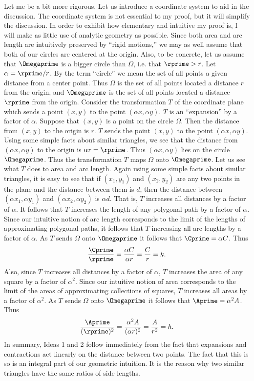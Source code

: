 \documentclass[twoside,twocolumn,12pt]{amsart}
\theoremstyle{plain}
\theoremstyle{definition}
\begin{document}
Let me be a bit more rigorous. Let us introduce a coordinate system
to aid in the discussion. The coordinate system is not essential to
my proof, but it will simplify the discussion.
In order to exhibit how elementary
and intuitive my proof is,  I will make as little use of
analytic geometry as possible.
Since both area and arc length are
intuitively preserved
by ``rigid motions,'' we may as well assume that both of our circles
are centered at the origin. Also, to be concrete, let us assume that
$\Omegaprime$ is a bigger circle than $\Omega$, i.e. that $\rprime>r$.
Let $\alpha=\rprime/r$.
By the term ``circle''
we mean the set of all points a given distance from a center point.
Thus $\Omega$ is the set of all points located a distance $r$ from the
origin, and $\Omegaprime$ is the set of all points located a distance
$\rprime$ from the origin.
Consider the transformation $T$ of the coordinate
plane which sends a point $(x,y)$ to the point $(\alpha x, \alpha y)$.
$T$ is an ``expansion'' by a factor of $\alpha$. Suppose that $(x,y)$ is
a point on the circle $\Omega$. Then the distance from $(x,y)$ to
the origin is $r$. $T$ sends the point $(x,y)$ to the point
$(\alpha x, \alpha y)$. Using some simple facts about similar triangles,
  we see that the distance from $(\alpha x, \alpha y)$ to the
origin is $\alpha r =\rprime$. Thus $(\alpha x, \alpha y)$ lies on
the circle $\Omegaprime$. Thus the transformation $T$ maps
$\Omega$ onto $\Omegaprime$. Let us see what $T$ does to area and
arc length.  Again using some simple facts about similar triangles,
it is easy to see that if $(x_1,y_1)$ and $(x_2,y_2)$ are any two
points in the plane and the distance between them is $d$, then the distance
between $(\alpha x_1, \alpha y_1)$ and $(\alpha x_2, \alpha y_2)$
is $\alpha d$. That is, $T$ increases all distances by a factor of $\alpha$.
It follows that $T$ increases the length of any polygonal path by a
factor of $\alpha$. Since our intuitive notion of  arc length corresponds
to the limit of the lengths of approximating polygonal paths, it follows
that $T$ increasing all arc lengths by a factor of $\alpha$. As $T$ sends
$\Omega$ onto $\Omegaprime$ it follows that $\Cprime=\alpha C$.
Thus
$$\frac{\Cprime}{\rprime}=\frac{\alpha C}{\alpha r}=\frac{C}{r}=k.$$
Also, since $T$ increases all distances by a factor of $\alpha$, $T$
increases the area of any square by a factor of $\alpha^2$. Since our
intuitive notion of area corresponds to the limit of the areas of
approximating collections of squares, $T$ increases all areas by a factor
of $\alpha^2$. As $T$ sends $\Omega$ onto $\Omegaprime$ it follows that
$\Aprime=\alpha^2 A$. Thus
$$\frac{\Aprime}{(\rprime)^2}=
\frac{\alpha^2 A}{(\alpha r)^2}=\frac{A}{r^2}=h.$$
In summary, Ideas 1 and 2 follow immediately from the fact that expansions
and contractions act linearly on the distance between two points. The
fact that this is so is an integral part of our geometric intuition. It
is the reason why two similar triangles have the same ratios  of side
lengths.
\end{document}
